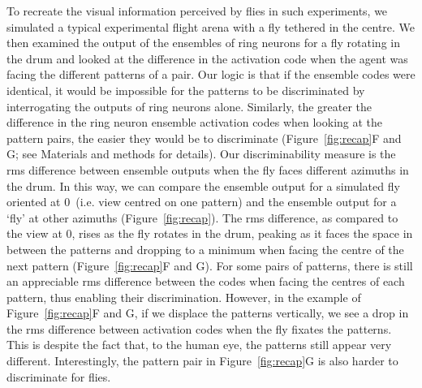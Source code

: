 To recreate the visual information perceived by flies in such experiments, we simulated a typical experimental flight arena with a fly tethered in the centre. We then examined the output of the ensembles of ring neurons for a fly rotating in the drum and looked at the difference in the activation code when the agent was facing the different patterns of a pair. Our logic is that if the ensemble codes were identical, it would be impossible for the patterns to be discriminated by interrogating the outputs of ring neurons alone. Similarly, the greater the difference in the ring neuron ensemble activation codes when looking at the pattern pairs, the easier they would be to discriminate (Figure~\ref{fig:recap}F and G; see Materials and methods for details). Our discriminability measure is the \ac{rms} difference between ensemble outputs when the fly faces different azimuths in the drum. In this way, we can compare the ensemble output for a simulated fly oriented at 0\degree\ (i.e. view centred on one pattern) and the ensemble output for a ‘fly’ at other azimuths (Figure~\ref{fig:recap}). The \ac{rms} difference, as compared to the view at 0\degree, rises as the fly rotates in the drum, peaking as it faces the space in between the patterns and dropping to a minimum when facing the centre of the next pattern (Figure~\ref{fig:recap}F and G). For some pairs of patterns, there is still an appreciable \ac{rms} difference between the codes when facing the centres of each pattern, thus enabling their discrimination. However, in the example of Figure~\ref{fig:recap}F and G, if we displace the patterns vertically, we see a drop in the \ac{rms} difference between activation codes when the fly fixates the patterns. This is despite the fact that, to the human eye, the patterns still appear very different. Interestingly, the pattern pair in Figure~\ref{fig:recap}G is also harder to discriminate for flies.

